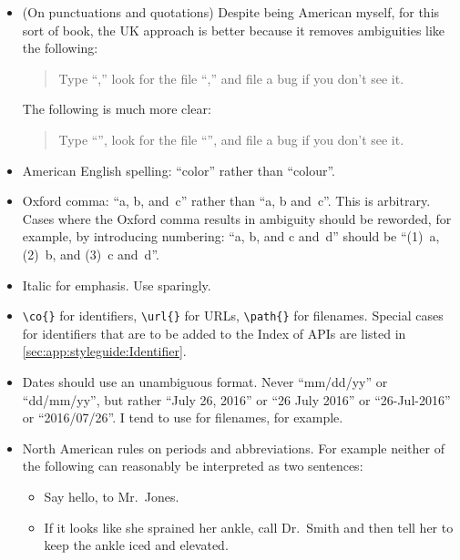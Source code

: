 \begin{itemize}
\item (On punctuations and quotations)
  Despite being American myself, for this sort of book, the UK approach
  is better because it removes ambiguities like the following:
  \begin{quote}
    Type ``,'' look for the file ``,''
    and file a bug if you don't see it.
  \end{quote}

  The following is much more clear:
  \begin{quote}
    Type ``'', look for the file ``'',
    and file a bug if you don't see it.
  \end{quote}
\item American English spelling: ``color'' rather than ``colour''.
\item Oxford comma: ``a, b, and~c'' rather than ``a, b and~c''.
  This is arbitrary.
  Cases where the Oxford comma results in ambiguity should be reworded,
  for example, by introducing numbering:  ``a, b, and c and~d'' should
  be ``(1)~a, (2)~b, and (3)~c and~d''.
\item Italic for emphasis.
  Use sparingly.
\item \verb|\co{}| for identifiers, \verb|\url{}| for URLs,
  \verb|\path{}| for filenames.
  Special cases for identifiers that are to be added to the Index of
  APIs are listed in
  \cref{sec:app:styleguide:Identifier}.
\item Dates should use an unambiguous format.
  Never ``mm/dd/yy'' or ``dd/mm/yy'', but rather ``July 26, 2016''
  or ``26 July 2016'' or ``26-Jul-2016'' or ``2016/07/26''.
  I tend to use  for filenames, for example.
\item North American rules on periods and abbreviations.
  For example neither of the following can reasonably be interpreted
  as two sentences:
  \begin{itemize}
  \item Say hello, to Mr.~Jones.
  \item If it looks like she sprained her ankle, call Dr.~Smith and
    then tell her to keep the ankle iced and elevated.
  \end{itemize}


\end{itemize}
